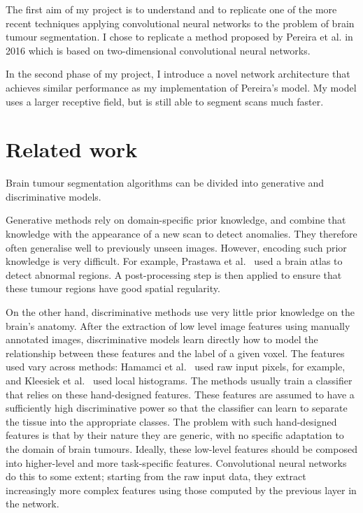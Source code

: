 \documentclass[12pt,a4paper,twoside,openright]{report}
\begin{document}
The first aim of my project is to understand and to replicate one of the more recent techniques applying convolutional neural networks to the problem of brain tumour segmentation. I chose to replicate a method proposed by Pereira et al.\cite{pereira} in 2016 which is based on two-dimensional convolutional neural networks. 

In the second phase of my project, I introduce a novel network architecture that achieves similar performance as my implementation of Pereira's model. My model uses a larger receptive field, but is still able to segment scans much faster.

\section{Related work}
Brain tumour segmentation algorithms can be divided into generative and discriminative models.

Generative methods rely on domain-specific prior knowledge, and combine that knowledge with the appearance of a new scan to detect anomalies. They therefore often generalise well to previously unseen images. However, encoding such prior knowledge is very difficult. For example, Prastawa et al.\ \cite{prastawa} used a brain atlas to detect abnormal regions. A post-processing step is then applied to ensure that these tumour regions have good spatial regularity.

On the other hand, discriminative methods use very little prior knowledge on the brain's anatomy. After the extraction of low level image features using manually annotated images, discriminative models learn directly how to model the relationship between these features and the label of a given voxel. The features used vary across methods: Hamamci et al.\ \cite{hamamci} used raw input pixels, for example, and Kleesiek et al.\ \cite{kleesiek} used local histograms. The methods usually train a classifier that relies on these hand-designed features. These features are assumed to have a sufficiently high discriminative power so that the classifier can learn to separate the tissue into the appropriate classes. The problem with such \mbox{hand-designed} features is that by their nature they are generic, with no specific adaptation to the domain of brain tumours. Ideally, these low-level features should be composed into higher-level and more task-specific features. Convolutional neural networks do this to some extent; starting from the raw input data, they extract increasingly more complex features using those computed by the previous layer in the network.
\end{document}
